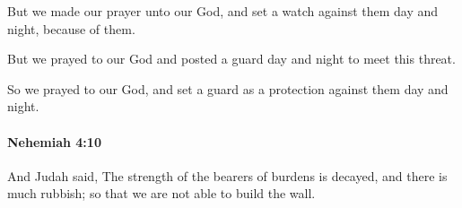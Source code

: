 			\begin{versebox}
					\item[BHS] 
					\item[LXX] 
					\item[ASV] But we made our prayer unto our God, and set a watch against them day and night, because of them.
					\item[NIV] But we prayed to our God and posted a guard day and night to meet this threat.
					\item[NRSV] So we prayed to our God, and set a guard as a protection against them day and night.
			\end{versebox}

		\paragraph{Nehemiah 4:10} %
			\label{NEHEMIAH-4-10}

			And Judah said, The strength of the bearers of burdens is decayed, and there is much rubbish; so that we are not able to build the wall.

